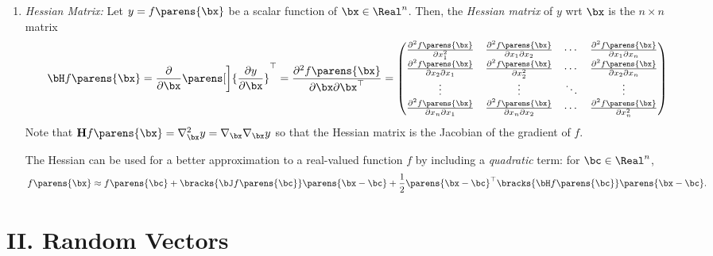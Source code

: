 \documentclass[12pt]{article}
\begin{document}
\begin{enumerate}[label=\textbf{\arabic*.}]
\begin{enumerate}
		\item \textit{Hessian Matrix:} %
		Let $y = f \parens{\bx}$ be a scalar function of $\bx \in \Real^n$. Then, the \textit{Hessian matrix} of $y$ wrt $\bx$ is the $n \times n$ matrix 
		\begin{align*}
			\bH f \parens{\bx} = \frac{\partial}{\partial \bx}\parens[\bigg]{\frac{\partial y}{\partial \bx}}^\top = \frac{\partial^2 f \parens{\bx}}{\partial \bx \partial \bx^\top} = \begin{pmatrix}
			\frac{\partial^2 f \parens{\bx}}{\partial x_1^2} & \frac{\partial^2 f \parens{\bx}}{\partial x_1 \partial x_2} & \cdots & \frac{\partial^2 f \parens{\bx}}{\partial x_1 \partial x_n} \\ 
			\frac{\partial^2 f \parens{\bx}}{\partial x_2 \partial x_1} & \frac{\partial^2 f \parens{\bx}}{\partial x_2^2} & \cdots & \frac{\partial^2 f \parens{\bx}}{\partial x_2 \partial x_n} \\ 
			\vdots & \vdots & \ddots & \vdots \\ 
			\frac{\partial^2 f \parens{\bx}}{\partial x_n \partial x_1} & \frac{\partial^2 f \parens{\bx}}{\partial x_n \partial x_2} & \cdots & \frac{\partial^2 f \parens{\bx}}{\partial x_n^2} \\
			\end{pmatrix}
		\end{align*}
		Note that $\mathbf{H} f \parens{\bx} = \nabla^2_\bx y = \nabla _\bx \nabla_\bx y$ so that the Hessian matrix is the Jacobian of the gradient of $f$. 
		
		The Hessian can be used for a better approximation to a real-valued function $f$ by including a \textit{quadratic} term: for $\bc \in \Real^n$, 
		\begin{align}
			f \parens{\bx} \approx f \parens{\bc} + \bracks{ \bJ f \parens{\bc} } \parens{\bx - \bc} + \frac{1}{2} \parens{\bx - \bc}^\top \bracks{ \bH f \parens{\bc}} \parens{\bx - \bc}. 
		\end{align}
	\end{enumerate}
\end{enumerate}

\section*{II. Random Vectors} 
\end{document}
